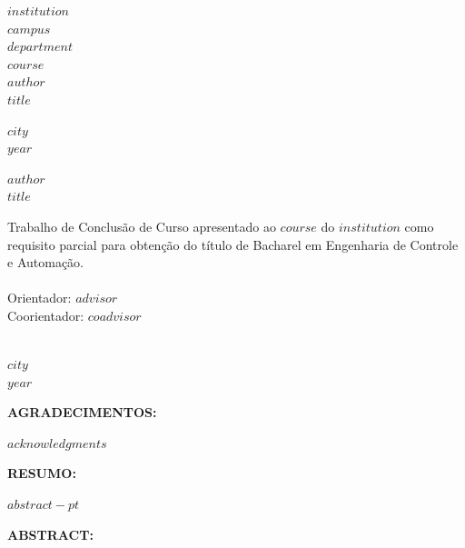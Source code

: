 \documentclass[
  12pt,
  oneside,
  a4paper,
  chapter=TITLE,
  english,portuguese
]{abntex2}
\begin{document}
\begin{center}
    {\bfseries
    $institution$ \\
    $campus$ \\
    $department$ \\
    $course$
    } \\[2.5cm]

    {\bfseries
    $author$
    } \\[4cm]

    {\bfseries
    $title$
    } \\[9cm]

    \vfill

    {\bfseries
    $city$ \\
    $year$
    }
\end{center}

\newpage

\begin{center}
    {\bfseries
    $author$
    } \\[4cm]

    {\bfseries
    $title$
    } \\[3cm]

    \hspace{.45\textwidth}
    \begin{minipage}{.5\textwidth}
        Trabalho de Conclusão de Curso apresentado ao $course$ do $institution$ como requisito parcial para obtenção do título de Bacharel em Engenharia de Controle e Automação.
        \\ \\
        Orientador: $advisor$
        \\ Coorientador: $coadvisor$
    \end{minipage}
    \\[4cm]

    {\bfseries
    $city$ \\
    $year$
    }
\end{center}

\newpage

\noindent\textbf{AGRADECIMENTOS:}

\vspace{\onelineskip}
$acknowledgments$
\newpage

\noindent\textbf{RESUMO:}

\vspace{\onelineskip}
$abstract-pt$
\newpage

\noindent\textbf{ABSTRACT:}
\end{document}
